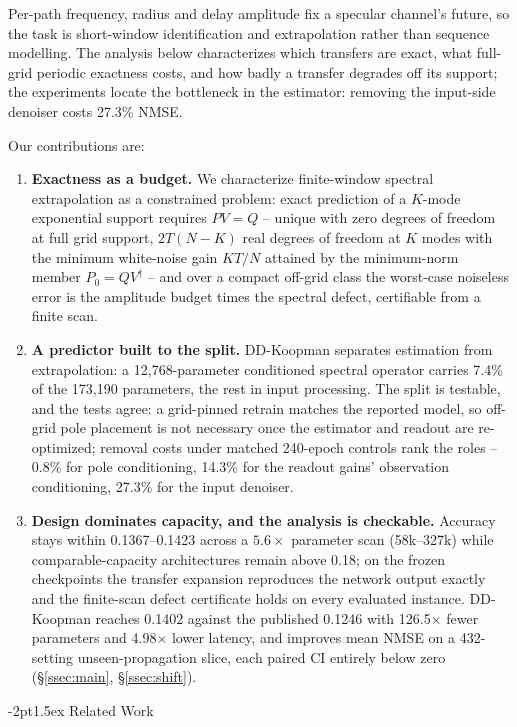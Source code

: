 \documentclass{article}
\makeatletter
\renewcommand\section{\@startsection{section}{1}{\z@}%
  {-2pt}{1.5ex}%
  {\normalfont\Large\bfseries}}
\makeatother
\begin{document}
Per-path frequency, radius and delay amplitude fix a specular
channel's future, so the task is short-window identification and
extrapolation rather than sequence modelling. The
analysis below characterizes which transfers are exact, what full-grid
periodic exactness costs, and how badly a transfer
degrades off its support; the
experiments locate the bottleneck in the estimator: removing the
input-side denoiser costs 27.3\% NMSE.

Our contributions are:
\begin{enumerate}\itemsep1pt
\item \textbf{Exactness as a budget.} We characterize finite-window
spectral extrapolation as a constrained problem: exact prediction of a
$K$-mode exponential support requires $PV=Q$ -- unique with zero
degrees of freedom at full grid support, $2T(N{-}K)$ real degrees of
freedom at $K$ modes with the minimum white-noise gain $KT/N$ attained
by the minimum-norm member $P_0=QV^{\dagger}$ -- and over a compact
off-grid class the worst-case noiseless error is the amplitude budget
times the spectral defect, certifiable from a finite scan.
\item \textbf{A predictor built to the split.} DD-Koopman separates
estimation from extrapolation: a 12{,}768-parameter
conditioned spectral operator carries 7.4\% of the 173{,}190 parameters,
the rest in input processing. The split is testable, and the tests
agree: a grid-pinned retrain matches the reported model, so off-grid
pole placement is not necessary once the estimator and readout are
re-optimized; removal costs under matched 240-epoch controls rank the
roles -- 0.8\% for pole conditioning, 14.3\% for the readout gains'
observation conditioning, 27.3\% for the input denoiser.
\item \textbf{Design dominates capacity, and the analysis is checkable.}
Accuracy stays within 0.1367--0.1423 across a $5.6\times$ parameter scan
(58k--327k) while comparable-capacity architectures remain above 0.18; on
the frozen checkpoints the transfer expansion reproduces the network
output exactly and the finite-scan defect certificate holds on every
evaluated instance. DD-Koopman reaches 0.1402 against the published 0.1246
with 126.5$\times$ fewer parameters and 4.98$\times$ lower
latency, and improves mean NMSE on a 432-setting unseen-propagation
slice, each paired CI entirely below zero
(\S\ref{ssec:main}, \S\ref{ssec:shift}).
\end{enumerate}

\section{Related Work}
\label{sec:related}
\end{document}
